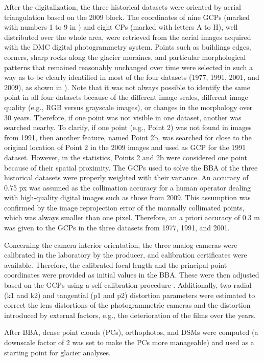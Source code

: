 After the digitalization, the three historical datasets were oriented by aerial triangulation based on the 2009 block. The coordinates of nine GCPs (marked with numbers 1 to 9 in ) and eight CPs (marked with letters A to H), well distributed over the whole area, were retrieved from the aerial images acquired with the DMC digital photogrammetry system.
Points such as buildings edges, corners, sharp rocks along the glacier moraines, and particular morphological patterns that remained reasonably unchanged over time were selected in such a way as to be clearly identified in most of the four datasets (1977, 1991, 2001, and 2009), as shown in ).
Note that it was not always possible to identify the same point in all four datasets because of the different image scales, different image quality (e.g., RGB versus grayscale images), or changes in the morphology over 30 years. Therefore, if one point was not visible in one dataset, another was searched nearby. To clarify, if one point (e.g., Point 2) was not found in images from 1991, then another feature, named Point 2b, was searched for close to the original location of Point 2 in the 2009 images and used as GCP for the 1991 dataset. However, in the statistics, Points 2 and 2b were considered one point because of their spatial proximity.
The GCPs used to solve the BBA of the three historical datasets were properly weighted with their variance. An accuracy of 0.75 px was assumed as the collimation accuracy for a human operator dealing with high-quality digital images such as those from 2009. This assumption was confirmed by the image reprojection error of the manually collimated points, which was always smaller than one pixel. Therefore, an a priori accuracy of 0.3 m was given to the GCPs in the three datasets from 1977, 1991, and 2001.

Concerning the camera interior orientation, the three analog cameras were calibrated in the laboratory by the producer, and calibration certificates were available. 
Therefore, the calibrated focal length and the principal point coordinates were provided as initial values in the BBA. 
These were then adjusted based on the GCPs using a self-calibration procedure \citep{jacobsen2004issues}. Additionally, two radial (k1 and k2) and tangential (p1 and p2) distortion parameters were estimated to correct the lens distortions of the photogrammetric cameras and the distortion introduced by external factors, e.g., the deterioration of the films over the years.

After BBA, dense point clouds (PCs), orthophotos, and DSMs were computed (a downscale factor of 2 was set to make the PCs more manageable) and used as a starting point for glacier analyses.

